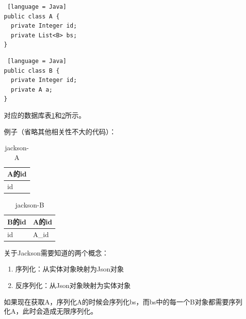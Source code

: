 \begin{lstlisting} [language = Java]
public class A {
  private Integer id;
  private List<B> bs;
}
\end{lstlisting}

\begin{lstlisting} [language = Java]
public class B {
  private Integer id;
  private A a;
}
\end{lstlisting}

对应的数据库表\ref{jackson-A}和\ref{jackson-B}所示。

例子（省略其他相关性不大的代码）：

\begin{table}[H]
  \centering
  \song\wuhao
  \caption{jackson-A}
  \label{jackson-A}
  \begin{tabular}{|l|}
    \hline
    A的id \\ \hline
    id    \\ \hline
  \end{tabular}
\end{table}

\begin{table}[H]
  \centering
  \song\wuhao
  \caption{jackson-B}
  \label{jackson-B}
  \begin{tabular}{|l|l|}
    \hline
    B的id & A的id \\ \hline
    id    & A\_id \\ \hline
  \end{tabular}
\end{table}

关于Jackson需要知道的两个概念：
\begin{enumerate}
  \item 序列化：从实体对象映射为Json对象
  \item 反序列化：从Json对象映射为实体对象
\end{enumerate}

如果现在获取A，序列化A的时候会序列化bs，而bs中的每一个B对象都需要序列化A，此时会造成无限序列化。

